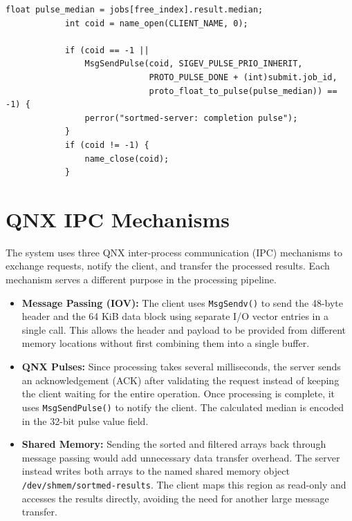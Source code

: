 \documentclass[12pt,a4paper,oneside]{report}
\begin{document}
\begin{lstlisting}[caption={Sending a completion pulse to the client}, label={lst:server-pulse}]
            float pulse_median = jobs[free_index].result.median;
            int coid = name_open(CLIENT_NAME, 0);

            if (coid == -1 ||
                MsgSendPulse(coid, SIGEV_PULSE_PRIO_INHERIT,
                             PROTO_PULSE_DONE + (int)submit.job_id,
                             proto_float_to_pulse(pulse_median)) == -1) {
                perror("sortmed-server: completion pulse");
            }
            if (coid != -1) {
                name_close(coid);
            }
\end{lstlisting}

\section{QNX IPC Mechanisms}
\label{sec:qnx-ipc}

The system uses three QNX inter-process communication (IPC) mechanisms to exchange requests, notify the client, and transfer the processed results. Each mechanism serves a different purpose in the processing pipeline.

\begin{itemize}
    \item \textbf{Message Passing (IOV):} The client uses \texttt{MsgSendv()} to send the 48-byte header and the 64 KiB data block using separate I/O vector entries in a single call. This allows the header and payload to be provided from different memory locations without first combining them into a single buffer.

    \item \textbf{QNX Pulses:} Since processing takes several milliseconds, the server sends an acknowledgement (ACK) after validating the request instead of keeping the client waiting for the entire operation. Once processing is complete, it uses \texttt{MsgSendPulse()} to notify the client. The calculated median is encoded in the 32-bit pulse value field.

    \item \textbf{Shared Memory:} Sending the sorted and filtered arrays back through message passing would add unnecessary data transfer overhead. The server instead writes both arrays to the named shared memory object \texttt{/dev/shmem/sortmed-results}. The client maps this region as read-only and accesses the results directly, avoiding the need for another large message transfer.
\end{itemize}
\end{document}
